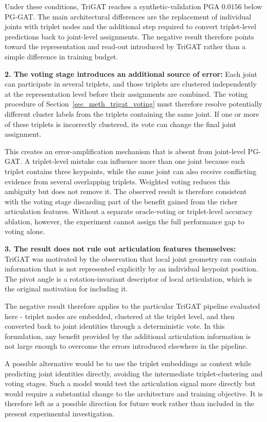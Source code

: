 Under these conditions, TriGAT reaches a synthetic-validation PGA
$0.0156$ below PG-GAT.
The main architectural differences are the replacement of individual
joints with triplet nodes
and the additional step required to convert triplet-level predictions
back to joint-level assignments.
The negative result therefore points toward the representation
and read-out introduced by TriGAT
rather than a simple difference in training budget.

\textbf{2. The voting stage introduces an additional source of
error:}
Each joint can participate in several triplets,
and those triplets are clustered independently at the representation
level before their assignments are combined.
The voting procedure of Section~\ref{sec_meth_trigat_voting}
must therefore resolve potentially different cluster labels from the
triplets containing the same joint.
If one or more of these triplets is incorrectly clustered,
its vote can change the final joint assignment.

This creates an error-amplification mechanism that is absent from
joint-level PG-GAT.
A triplet-level mistake can influence more than one joint because each
triplet contains three keypoints,
while the same joint can also receive conflicting evidence from several
overlapping triplets.
Weighted voting reduces this ambiguity but does not remove it.
The observed result is therefore consistent with the voting stage
discarding part of the benefit gained from the richer articulation
features.
Without a separate oracle-voting or triplet-level accuracy ablation,
however, the experiment cannot assign the full performance gap
to voting alone.

\textbf{3. The result does not rule out articulation features themselves:}
TriGAT was motivated by the observation that local joint geometry can
contain information that is not represented explicitly by an
individual keypoint position.
The pivot angle is a rotation-invariant descriptor of local
articulation,
which is the original motivation for including it.

The negative result therefore applies to the particular TriGAT
pipeline evaluated here -
triplet nodes are embedded,
clustered at the triplet level,
and then converted back to joint identities through a deterministic vote.
In this formulation,
any benefit provided by the additional articulation information
is not large enough to overcome the errors introduced elsewhere
in the pipeline.

A possible alternative would be to use the triplet embeddings as
context while predicting joint identities directly,
avoiding the intermediate triplet-clustering and voting stages.
Such a model would test the articulation signal more directly
but would require a substantial change to the architecture
and training objective.
It is therefore left as a possible direction for future work
rather than included in the present experimental investigation.